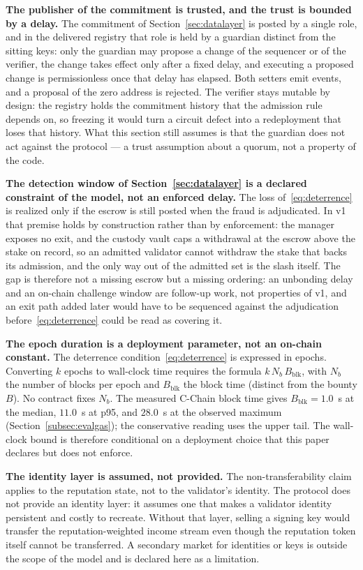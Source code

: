\documentclass[11pt,a4paper]{article}
\numberwithin{equation}{section}
\numberwithin{table}{section}
\begin{document}
\textbf{The publisher of the commitment is trusted, and the trust is bounded by a delay.} The commitment of Section~\ref{sec:datalayer} is posted by a single role, and in the delivered registry that role is held by a guardian distinct from the sitting keys: only the guardian may propose a change of the sequencer or of the verifier, the change takes effect only after a fixed delay, and executing a proposed change is permissionless once that delay has elapsed. Both setters emit events, and a proposal of the zero address is rejected. The verifier stays mutable by design: the registry holds the commitment history that the admission rule depends on, so freezing it would turn a circuit defect into a redeployment that loses that history. What this section still assumes is that the guardian does not act against the protocol --- a trust assumption about a quorum, not a property of the code.

\textbf{The detection window of Section~\ref{sec:datalayer} is a declared constraint of the model, not an enforced delay.} The loss of~\eqref{eq:deterrence} is realized only if the escrow is still posted when the fraud is adjudicated. In v1 that premise holds by construction rather than by enforcement: the manager exposes no exit, and the custody vault caps a withdrawal at the escrow above the stake on record, so an admitted validator cannot withdraw the stake that backs its admission, and the only way out of the admitted set is the slash itself. The gap is therefore not a missing escrow but a missing ordering: an unbonding delay and an on-chain challenge window are follow-up work, not properties of v1, and an exit path added later would have to be sequenced against the adjudication before~\eqref{eq:deterrence} could be read as covering it.

\textbf{The epoch duration is a deployment parameter, not an on-chain constant.} The deterrence condition~\eqref{eq:deterrence} is expressed in epochs. Converting $k$ epochs to wall-clock time requires the formula $k\,N_b\,B_{\mathrm{blk}}$, with $N_b$ the number of blocks per epoch and $B_{\mathrm{blk}}$ the block time (distinct from the bounty $B$). No contract fixes $N_b$. The measured C-Chain block time gives $B_{\mathrm{blk}} = 1.0$~s at the median, $11.0$~s at p95, and $28.0$~s at the observed maximum (Section~\ref{subsec:evalgas}); the conservative reading uses the upper tail. The wall-clock bound is therefore conditional on a deployment choice that this paper declares but does not enforce.

\textbf{The identity layer is assumed, not provided.} The non-transferability claim applies to the reputation state, not to the validator's identity. The protocol does not provide an identity layer: it assumes one that makes a validator identity persistent and costly to recreate. Without that layer, selling a signing key would transfer the reputation-weighted income stream even though the reputation token itself cannot be transferred. A secondary market for identities or keys is outside the scope of the model and is declared here as a limitation.
\end{document}
